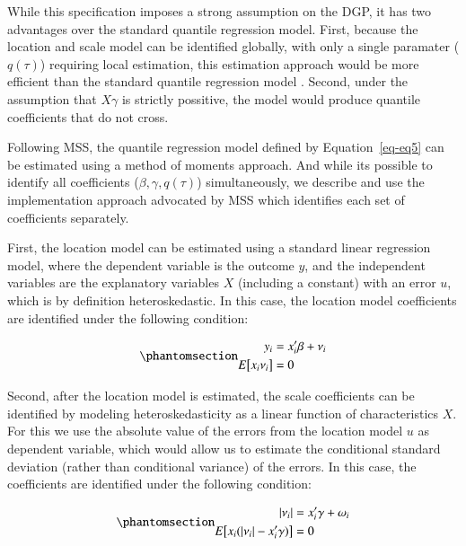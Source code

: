 \documentclass[
  authoryear,
  review,
  1p]{elsarticle}
\begin{document}
While this specification imposes a strong assumption on the DGP, it has
two advantages over the standard quantile regression model. First,
because the location and scale model can be identified globally, with
only a single paramater (\(q(\tau)\)) requiring local estimation, this
estimation approach would be more efficient than the standard quantile
regression model \citep{zhao2000}. Second, under the assumption that
\(X\gamma\) is strictly possitive, the model would produce quantile
coefficients that do not cross.

Following MSS, the quantile regression model defined by
Equation~\ref{eq-eq5} can be estimated using a method of moments
approach. And while its possible to identify all coefficients
(\(\beta,\gamma, q(\tau)\)) simultaneously, we describe and use the
implementation approach advocated by MSS which identifies each set of
coefficients separately.

First, the location model can be estimated using a standard linear
regression model, where the dependent variable is the outcome \(y\), and
the independent variables are the explanatory variables \(X\) (including
a constant) with an error \(u\), which is by definition heteroskedastic.
In this case, the location model coefficients are identified under the
following condition:

\begin{equation}\phantomsection\label{eq-eq7}{\begin{aligned}
      y_i &=x_i'\beta+\nu_i \\
      E\big[ x_i \nu_i\big] &=0
      \end{aligned}
}\end{equation}

Second, after the location model is estimated, the scale coefficients
can be identified by modeling heteroskedasticity as a linear function of
characteristics \(X\). For this we use the absolute value of the errors
from the location model \(u\) as dependent variable, which would allow
us to estimate the conditional standard deviation (rather than
conditional variance) of the errors. In this case, the coefficients are
identified under the following condition:

\begin{equation}\phantomsection\label{eq-eq8}{\begin{aligned}
  |\nu_i| &=x_i'\gamma+\omega_i \\
   E\big[ x_i (|\nu_i| -x_i'\gamma ) \big] &=0
  \end{aligned}
}\end{equation}
\end{document}
